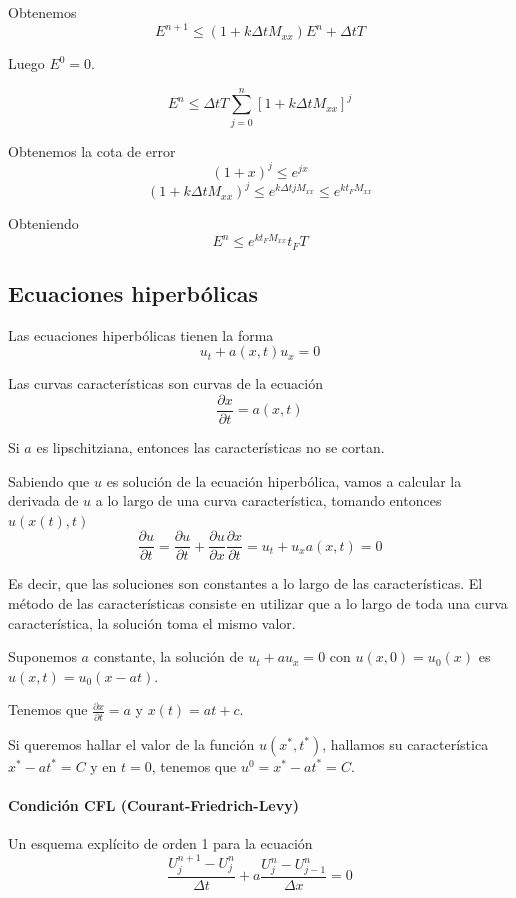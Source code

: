 Obtenemos
$$E^{n+1} \le (1+k\Delta tM_{xx})E^n + \Delta t T$$

Luego $E^0 = 0$.

$$E^n \le \Delta t T\sum_{j=0}^n\left[1+k\Delta t M_{xx}\right]^j$$

Obtenemos la cota de error
$$(1+x)^j\le e^{jx}$$
$$(1+k\Delta tM_{xx})^j \le e^{k\Delta t jM_{xx}}\le e^{kt_FM_{xx}}$$

Obteniendo
$$E^n \le e^{kt_F M_{xx}}t_FT$$

\subsection{Ecuaciones hiperbólicas}
Las ecuaciones hiperbólicas tienen la forma
$$u_t + a(x,t)u_x = 0$$

Las curvas características son curvas de la ecuación 
$$\frac{\partial x}{\partial t} = a(x,t)$$

Si $a$ es lipschitziana, entonces las características no se cortan.

Sabiendo que $u$ es solución de la ecuación hiperbólica, vamos a calcular la derivada de $u$ a lo largo de una curva característica, tomando entonces $u(x(t), t)$
$$\frac{\partial u}{\partial t} = \frac{\partial u}{\partial t} + \frac{\partial u}{\partial x}\frac{\partial x}{\partial t} = u_t+u_xa(x,t) = 0$$

Es decir, que las soluciones son constantes a lo largo de las características. El método de las características consiste en utilizar que a lo largo de toda una curva característica, la solución toma el mismo valor.

\begin{example}
	Suponemos $a$ constante, la solución de $u_t +au_x = 0$ con $u(x, 0) = u_0(x)$ es $u(x,t) = u_0(x-at)$.
	
	Tenemos que $\frac{\partial x}{\partial t} = a$ y $x(t) = at+c$.
	
	Si queremos hallar el valor de la función $u(x^*,t^*)$, hallamos su característica $x^* - at^* = C$ y en $t=0$, tenemos que $u^0 = x^*-at^* = C$.
\end{example}


\paragraph{Condición CFL (Courant-Friedrich-Levy)}
Un esquema explícito de orden 1 para la ecuación
$$\frac{U_{j}^{n+1}-U_{j}^{n}}{\Delta t} + a \frac{U_{j}^{n}-U_{j-1}^{n}}{\Delta x} = 0$$

